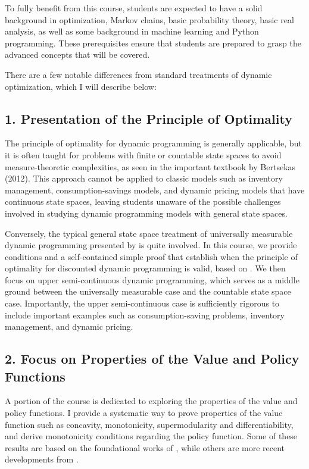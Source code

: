 \documentclass[letter,11pt]{article}
\begin{document}
To fully benefit from this course, students are expected to have a solid background in  optimization, Markov chains, basic probability theory, basic real analysis, as well as some background in machine learning and Python programming. These prerequisites ensure that students are prepared to grasp the advanced concepts that will be covered.

There are a few notable differences from standard treatments of dynamic optimization, which I will describe below:



\subsection*{1. Presentation of the Principle of Optimality}

The principle of optimality for dynamic programming is generally applicable, but it is often taught for problems with finite or countable state spaces to avoid measure-theoretic complexities, as seen in the important textbook by Bertsekas (2012). This approach cannot be applied to classic models such as inventory management, consumption-savings models, and dynamic pricing models that have continuous state spaces, leaving students unaware of the possible challenges involved in studying dynamic programming models with general state spaces.

Conversely, the typical general state space treatment of universally measurable dynamic programming presented by \cite{bertsekas1996stochastic} is quite involved. In this course, we provide conditions and a self-contained simple proof that establish when the principle of optimality for discounted dynamic programming is valid, based on \cite{light2024principle}. We then focus on upper semi-continuous dynamic programming, which serves as a middle ground between the universally measurable case and the countable state space case. Importantly, the upper semi-continuous case is sufficiently rigorous to include important examples such as consumption-saving problems, inventory management, and dynamic pricing.

\subsection*{2. Focus on Properties of the Value and Policy Functions}

A portion of the course is dedicated to exploring the properties of the value and policy functions. I provide a systematic way to prove properties of the value function such as concavity, monotonicity, supermodularity and differentiability, and derive monotonicity conditions regarding the policy function. Some of these results are based on the foundational works  of \cite{topkis1978minimizing,topkis1998supermodularity}, while others are more recent developments from \cite{light2021stochastic}.  
\end{document}
